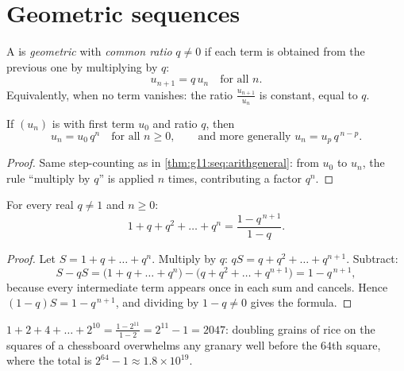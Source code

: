 \section{Geometric sequences}

\begin{definition}\label{def:g11:seq:geometric}
A  is \emph{geometric} with \emph{common
ratio} $q \neq 0$ if each term is obtained from the previous one by
multiplying by $q$:
\[
u_{n+1} = q\,u_n \quad \text{for all } n.
\]
Equivalently, when no term vanishes: the ratio $\frac{u_{n+1}}{u_n}$ is
constant, equal to $q$.
\end{definition}

\begin{theorem}\label{thm:g11:seq:geomgeneral}
If $(u_n)$ is  with first term $u_0$ and ratio $q$, then
\[
u_n = u_0\, q^n \quad \text{for all } n \geq 0,
\qquad\text{and more generally } u_n = u_p\, q^{\,n-p} .
\]
\end{theorem}

\begin{proof}
Same step-counting as in \cref{thm:g11:seq:arithgeneral}: from $u_0$ to
$u_n$, the rule ``multiply by $q$'' is applied $n$ times, contributing a
factor $q^n$.
\end{proof}

\begin{theorem}\label{thm:g11:seq:geomsum}
For every real $q \neq 1$ and  $n \geq 0$:
\[
1 + q + q^2 + \dots + q^n = \frac{1 - q^{\,n+1}}{1 - q}.
\]
\end{theorem}

\begin{proof}
Let $S = 1 + q + \dots + q^n$. Multiply by $q$:
$qS = q + q^2 + \dots + q^{n+1}$. Subtract:
\[
S - qS = \bigl(1 + q + \dots + q^n\bigr)
- \bigl(q + q^2 + \dots + q^{n+1}\bigr) = 1 - q^{\,n+1},
\]
because every intermediate term appears once in each sum and cancels.
Hence $(1 - q)S = 1 - q^{\,n+1}$, and dividing by $1 - q \neq 0$ gives the
formula.
\end{proof}

\begin{example}\label{ex:g11:seq:chessboard}
$1 + 2 + 4 + \dots + 2^{10} = \frac{1 - 2^{11}}{1 - 2} = 2^{11} - 1 =
2047$: doubling grains of rice on the squares of a chessboard overwhelms
any granary well before the $64$th square, where the total is
$2^{64} - 1 \approx 1.8 \times 10^{19}$.
\end{example}

